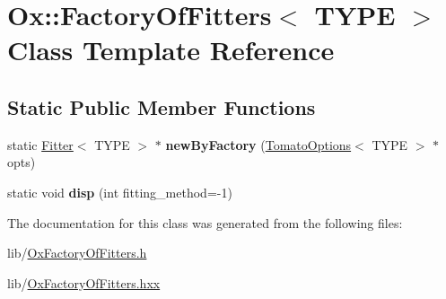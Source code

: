\hypertarget{class_ox_1_1_factory_of_fitters}{}\section{Ox\+:\+:Factory\+Of\+Fitters$<$ T\+Y\+PE $>$ Class Template Reference}
\label{class_ox_1_1_factory_of_fitters}
\subsection*{Static Public Member Functions}
\begin{DoxyCompactItemize}
\item 
static \hyperlink{class_ox_1_1_fitter}{Fitter}$<$ T\+Y\+PE $>$ $\ast$ {\bfseries new\+By\+Factory} (\hyperlink{class_ox_1_1_tomato_options}{Tomato\+Options}$<$ T\+Y\+PE $>$ $\ast$opts)\hypertarget{class_ox_1_1_factory_of_fitters_ab06c65d6b109d8f408140caa4d25b30c}{}\label{class_ox_1_1_factory_of_fitters_ab06c65d6b109d8f408140caa4d25b30c}

\item 
static void {\bfseries disp} (int fitting\+\_\+method=-\/1)\hypertarget{class_ox_1_1_factory_of_fitters_ac7272c8c931efaa1ea7b9f78c61f261a}{}\label{class_ox_1_1_factory_of_fitters_ac7272c8c931efaa1ea7b9f78c61f261a}

\end{DoxyCompactItemize}


The documentation for this class was generated from the following files\+:\begin{DoxyCompactItemize}
\item 
lib/\hyperlink{_ox_factory_of_fitters_8h}{Ox\+Factory\+Of\+Fitters.\+h}\item 
lib/\hyperlink{_ox_factory_of_fitters_8hxx}{Ox\+Factory\+Of\+Fitters.\+hxx}\end{DoxyCompactItemize}
